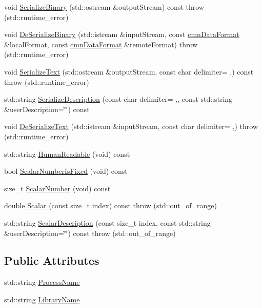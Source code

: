 \begin{DoxyCompactItemize}
\item 
void \hyperlink{classmts_description_load_library_a36dcc975e60f33c145d5b52ea9ff87b2}{Serialize\+Binary} (std\+::ostream \&output\+Stream) const   throw (std\+::runtime\+\_\+error)
\item 
void \hyperlink{classmts_description_load_library_ac2c7b8d69f01b082c9237fe7d263a09c}{De\+Serialize\+Binary} (std\+::istream \&input\+Stream, const \hyperlink{classcmn_data_format}{cmn\+Data\+Format} \&local\+Format, const \hyperlink{classcmn_data_format}{cmn\+Data\+Format} \&remote\+Format)  throw (std\+::runtime\+\_\+error)
\item 
void \hyperlink{classmts_description_load_library_abaf176264e242024c9e5e4f86e45f25f}{Serialize\+Text} (std\+::ostream \&output\+Stream, const char delimiter= \textquotesingle{},\textquotesingle{}) const   throw (std\+::runtime\+\_\+error)
\item 
std\+::string \hyperlink{classmts_description_load_library_ae3c7d2b8bf0c93e9ec8cf69b7e6a08f6}{Serialize\+Description} (const char delimiter= \textquotesingle{},\textquotesingle{}, const std\+::string \&user\+Description=\char`\"{}\char`\"{}) const 
\item 
void \hyperlink{classmts_description_load_library_abf2adbff4c26ef5bd4ca6b465a7d1de0}{De\+Serialize\+Text} (std\+::istream \&input\+Stream, const char delimiter= \textquotesingle{},\textquotesingle{})  throw (std\+::runtime\+\_\+error)
\item 
std\+::string \hyperlink{classmts_description_load_library_a5efd4a98f1420d041653f1043b0d479d}{Human\+Readable} (void) const 
\item 
bool \hyperlink{classmts_description_load_library_ad3df9d64a2870b49962d0f2b1f50b0c5}{Scalar\+Number\+Is\+Fixed} (void) const 
\item 
size\+\_\+t \hyperlink{classmts_description_load_library_ac5a7a1b53e0d614e753a8e3fa0727039}{Scalar\+Number} (void) const 
\item 
double \hyperlink{classmts_description_load_library_a65d1290e22d59b527ab893542e3ea44c}{Scalar} (const size\+\_\+t index) const   throw (std\+::out\+\_\+of\+\_\+range)
\item 
std\+::string \hyperlink{classmts_description_load_library_a74b15cf6ac15daa53f84ce130ad63397}{Scalar\+Description} (const size\+\_\+t index, const std\+::string \&user\+Description=\char`\"{}\char`\"{}) const   throw (std\+::out\+\_\+of\+\_\+range)
\end{DoxyCompactItemize}
\subsection*{Public Attributes}
\begin{DoxyCompactItemize}
\item 
std\+::string \hyperlink{classmts_description_load_library_a4632a3ec13b1887b43383d2ee1e4c18f}{Process\+Name}
\item 
std\+::string \hyperlink{classmts_description_load_library_aaefed2ef09ccb43bf153e813ab022167}{Library\+Name}
\end{DoxyCompactItemize}


